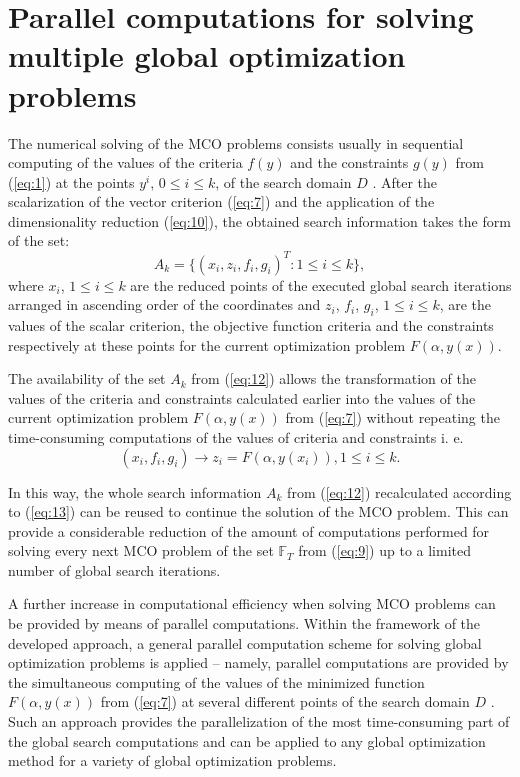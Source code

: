 \documentclass[runningheads]{llncs}
\begin{document}
\section{Parallel computations for solving multiple global optimization problems} \label{sec:4}

The numerical solving of the MCO problems consists usually in sequential computing of the values of the criteria $f(y)$ and the constraints $g(y)$ from (\ref{eq:1}) at the points $y^i$, $0 \leq i \leq k$, of the search domain $D$ \cite{c10,c12,c13,c14}. After the scalarization of the vector criterion (\ref{eq:7}) and the application of the dimensionality reduction (\ref{eq:10}), the obtained search information takes the form of the set:
\begin{equation}
  A_k=\{(x_i,z_i,f_i,g_i )^T:1 \leq i \leq k\},
\label{eq:12}
\end{equation}
where $x_i$, $1 \leq i \leq k$ are the reduced points of the executed global search iterations arranged in ascending order of the coordinates and $z_i$,  $f_i$, $g_i$, $1 \leq i \leq k$, are the values of the scalar criterion, the objective function criteria and the constraints respectively at these points for the current optimization problem $F(\alpha,y(x))$.

The availability of the set $A_k$ from (\ref{eq:12}) allows the transformation of the values of the criteria and constraints calculated earlier into the values of the current optimization problem $F(\alpha,y(x))$ from (\ref{eq:7}) without repeating the time-consuming computations of the values of criteria and constraints i. e.
\begin{equation}
  (x_i,f_i,g_i ) \to z_i = F(\alpha,y(x_i)) ,1 \leq i \leq k.
\label{eq:13}
\end{equation}

In this way, the whole search information $A_k$ from (\ref{eq:12}) recalculated according to (\ref{eq:13}) can be reused to continue the solution of the MCO problem. This can provide a considerable reduction of the amount of computations performed for solving every next MCO problem of the set $\mathbb{F}_T$ from (\ref{eq:9}) up to a limited number of global search iterations.

A further increase in computational efficiency when solving MCO problems can be provided by means of parallel computations. Within the framework of the developed approach, a general parallel computation scheme for solving global optimization problems is applied -- namely, parallel computations are provided by the simultaneous computing of the values of the minimized function $F(\alpha,y(x))$ from (\ref{eq:7}) at several different points of the search domain $D$ \cite{c6,c10}. Such an approach provides the parallelization of the most time-consuming part of the global search computations and can be applied to any global optimization method for a variety of global optimization problems.
\end{document}
